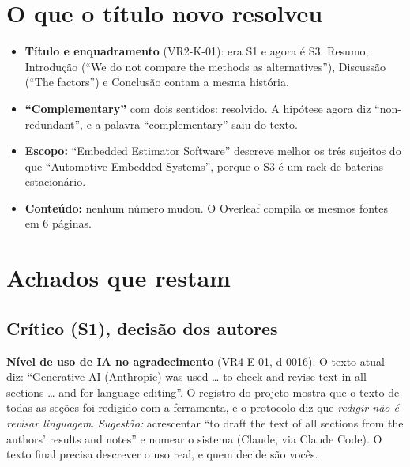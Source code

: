 \documentclass[10pt,a4paper]{article}
\begin{document}
\section{O que o título novo resolveu}
\begin{itemize}
\item \textbf{Título e enquadramento} (VR2-K-01): era S1 e agora é S3. Resumo, Introdução (``We do not compare the methods as alternatives''), Discussão (``The factors'') e Conclusão contam a mesma história.
\item \textbf{``Complementary''} com dois sentidos: resolvido. A hipótese agora diz ``non-redundant'', e a palavra ``complementary'' saiu do texto.
\item \textbf{Escopo:} ``Embedded Estimator Software'' descreve melhor os três sujeitos do que ``Automotive Embedded Systems'', porque o S3 é um rack de baterias estacionário.
\item \textbf{Conteúdo:} nenhum número mudou. O Overleaf compila os mesmos fontes em 6 páginas.
\end{itemize}

\section{Achados que restam}

\subsection{Crítico (S1), decisão dos autores}
\begin{panel}
\textbf{Nível de uso de IA no agradecimento} (VR4-E-01, d-0016). O texto atual diz: ``Generative AI (Anthropic) was used \ldots{} to check and revise text in all sections \ldots{} and for language editing''. O registro do projeto mostra que o texto de todas as seções foi redigido com a ferramenta, e o protocolo diz que \emph{redigir não é revisar linguagem}. \emph{Sugestão:} acrescentar ``to draft the text of all sections from the authors' results and notes'' e nomear o sistema (Claude, via Claude Code). O texto final precisa descrever o uso real, e quem decide são vocês.
\end{panel}
\end{document}

